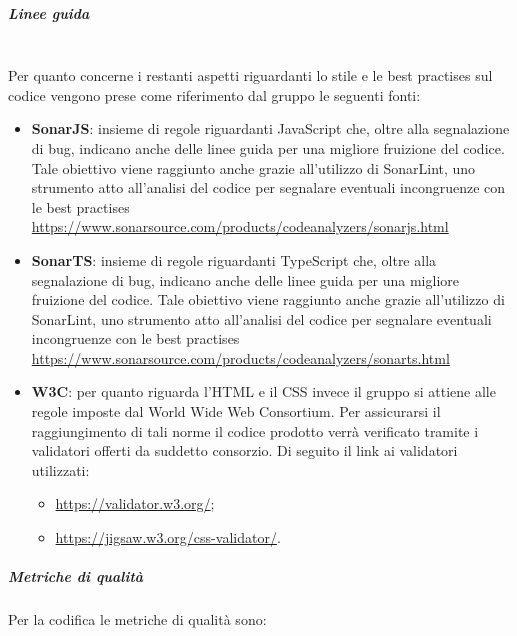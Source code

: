 \subparagraph*{Linee guida}\mbox{}\\ [1mm]
Per quanto concerne i restanti aspetti riguardanti lo stile e le best practises sul codice vengono prese come riferimento dal gruppo le seguenti fonti:
\begin{itemize}
	\item \textbf{SonarJS}: insieme di regole riguardanti JavaScript che, oltre alla segnalazione di bug, indicano anche delle linee guida per una migliore fruizione del codice. Tale obiettivo viene raggiunto anche grazie all'utilizzo di SonarLint, uno strumento atto all'analisi del codice per segnalare eventuali incongruenze con le best practises\\
	\centering\url{https://www.sonarsource.com/products/codeanalyzers/sonarjs.html}
	\item \textbf{SonarTS}: insieme di regole riguardanti TypeScript che, oltre alla segnalazione di bug, indicano anche delle linee guida per una migliore fruizione del codice. Tale obiettivo viene raggiunto anche grazie all'utilizzo di SonarLint, uno strumento atto all'analisi del codice per segnalare eventuali incongruenze con le best practises\\
	\centering\url{https://www.sonarsource.com/products/codeanalyzers/sonarts.html}
	\item \textbf{W3C}: per quanto riguarda l'HTML e il CSS invece il gruppo si attiene alle regole imposte dal World Wide Web Consortium. Per assicurarsi il raggiungimento di tali norme il codice prodotto verrà verificato tramite i validatori offerti da suddetto consorzio. Di seguito il link ai validatori utilizzati:
	\begin{itemize}
		\item \url{https://validator.w3.org/};
		\item \url{https://jigsaw.w3.org/css-validator/}.
	\end{itemize}
\end{itemize}
		\subparagraph{Metriche di qualità}
		Per la codifica le metriche di qualità sono:
